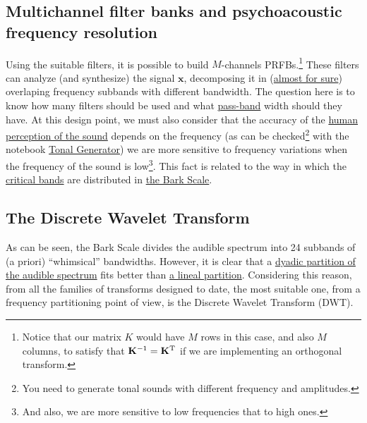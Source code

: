 
\subsection{Multichannel filter banks and psychoacoustic frequency resolution}

Using the suitable filters, it is possible to build $M$-channels
PRFBs.\footnote{Notice that our matrix $K$ would have $M$ rows in this
  case, and also $M$ columns, to satisfy that
  ${\mathbf K}^{-1}={\mathbf K}^{\text T}$ if we are implementing an
  orthogonal transform.}  These filters can analyze (and synthesize)
the signal ${\mathbf x}$, decomposing it in
(\href{https://en.wikipedia.org/wiki/Low-pass_filter#Ideal_and_real_filters}{almost
  for sure}) overlaping frequency subbands with different
bandwidth. The question here is to know how many filters should be
used and what
\href{https://en.wikipedia.org/wiki/Band-pass_filter}{pass-band} width
should they have. At this design point, we must also consider that the
accuracy of the
\href{https://en.wikipedia.org/wiki/Psychoacoustics}{human perception
  of the sound} depends on the frequency (as can be
checked\footnote{You need to generate tonal sounds with different
  frequency and amplitudes.} with the notebook
\href{https://github.com/Tecnologias-multimedia/InterCom/blob/master/tools/tonal_generator.ipynb}{Tonal
  Generator}) we are more sensitive to frequency variations when the
frequency of the sound is low\footnote{And also, we are more sensitive
  to low frequencies that to high ones.}. This fact is related to
the way in which the
\href{https://en.wikipedia.org/wiki/Critical_band}{critical bands} are
distributed in \href{https://en.wikipedia.org/wiki/Bark_scale}{the
  Bark Scale}.


\subsection{The Discrete Wavelet Transform}

As can be seen, the Bark Scale divides the audible spectrum into 24
subbands of (a priori) ``whimsical'' bandwidths. However, it is clear
that a \href{https://en.wikipedia.org/wiki/Octave_band}{dyadic
  partition of the audible spectrum} fits better than
\href{https://en.wikipedia.org/wiki/Wavelet_transform#Principle}{a
  lineal partition}. Considering this reason, from all the families of
transforms designed to date, the most suitable one, from a frequency
partitioning point of view, is the Discrete Wavelet Transform (DWT).

